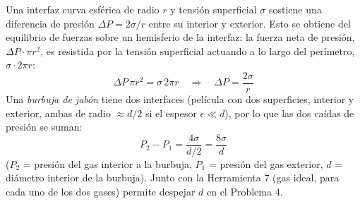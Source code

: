 \documentclass[12pt]{article}
\begin{document}
Una interfaz curva esf\'erica de radio $r$ y tensi\'on superficial $\sigma$ sostiene
una diferencia de presi\'on $\Delta P=2\sigma/r$ entre su interior y exterior. Esto se
obtiene del equilibrio de fuerzas sobre un hemisferio de la interfaz: la fuerza neta de
presi\'on, $\Delta P\cdot\pi r^2$, es resistida por la tensi\'on superficial actuando a
lo largo del per\'imetro, $\sigma\cdot 2\pi r$:
\[
\Delta P\,\pi r^2=\sigma\, 2\pi r
\quad\Longrightarrow\quad
\Delta P=\frac{2\sigma}{r}
\]
Una \emph{burbuja de jab\'on} tiene dos interfaces (pel\'icula con dos superficies,
interior y exterior, ambas de radio $\approx d/2$ si el espesor $\epsilon\ll d$), por lo
que las dos ca\'idas de presi\'on se suman:
\[
\boxed{P_2-P_1=\frac{4\sigma}{d/2}=\frac{8\sigma}{d}}
\]
($P_2$ = presi\'on del gas interior a la burbuja, $P_1$ = presi\'on del gas exterior,
$d$ = di\'ametro interior de la burbuja). Junto con la Herramienta 7 (gas ideal, para
cada uno de los dos gases) permite despejar $d$ en el Problema 4.
\end{document}
